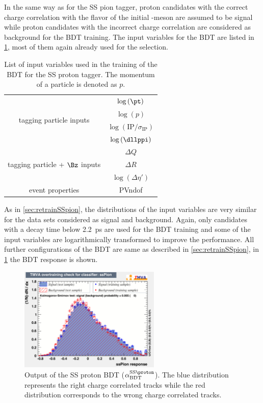 In the same way as for the SS pion tagger, proton candidates with the correct charge correlation with the flavor of the initial \B-meson are assumed to be signal while proton candidates with the incorrect charge correlation are considered as background for the BDT training.
The input variables for the BDT are listed in \cref{tab:BDTInputSSProton}, most of them again already used for the selection.
\begin{table}[tbp]
	\centering
	\caption{List of input variables used in the training of the BDT for the SS proton tagger.
	The momentum of a particle is denoted as $p$.}
	\begin{tabular}{cc}
		\toprule
		\multirow{4}{*}{tagging particle inputs} 	&	$\log\left(\pt\right)$ \\
													&	$\log\left(p\right)$\\
													&	$\log\left(\text{IP}/\sigma_\text{IP}\right)$\\
													&	$\log\left(\dllppi\right)$\\
		\midrule
		\multirow{3}{*}{tagging particle + $\Bz$ inputs} 	& $\Delta Q$\\
															& $\Delta R$\\
															& $\log\left(\Delta\eta'\right)$\\
		\midrule
		\multirow{1}{*}{event properties} 	& PVndof\\
		\bottomrule
	\end{tabular}
	\label{tab:BDTInputSSProton}
\end{table}
As in \cref{sec:retrainSSpion}, the distributions of the input variables are very similar for the data sets considered as signal and background.
Again, only \B candidates with a decay time below \SI{2.2}{\pico\second} are used for the BDT training and some of the input variables are logarithmically transformed to improve the performance.
All further configurations of the BDT are same as described in \cref{sec:retrainSSpion}, in \cref{fig:SSProtonBDTOutput} the BDT response is shown.
\begin{figure}[htbp]
	\begin{center}
		\includegraphics[width=0.6\textwidth]{08FlavourTagging/figs/SSProton_overtrain.pdf}
	\end{center}
	\caption{Output of the SS proton BDT ($\alpha^{\text{SS}\proton}_\text{BDT}$).
	The blue distribution represents the right charge correlated tracks while the red distribution corresponds to the wrong charge correlated tracks.}
	\label{fig:SSProtonBDTOutput}
\end{figure}
